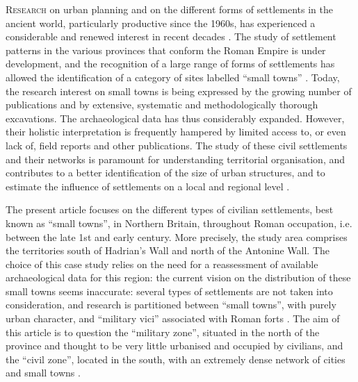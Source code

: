 	
\lettrine[lines=3,slope=4pt,findent=-3pt]{R}{esearch} on urban planning and on the different forms of settlements in the ancient world, particularly productive since the 1960s, has experienced a considerable and renewed interest in recent decades \parencite[227--228]{Petit_1994a}. The study of settlement patterns in the various provinces that conform the Roman Empire is under development, and the recognition of a large range of forms of settlements has allowed the identification of a category of sites labelled “small towns” \parencites[cf.]{Rodwell_1975}{Todd_1970}{Wacher_1995}. Today, the research interest on small towns is being expressed by the growing number of publications \parencites{Blagg_1984}{Favory_2012}{James_2001}{Jones_1991} and by extensive, systematic and methodologically thorough excavations. The archaeological data has thus considerably expanded. However, their holistic interpretation is frequently hampered by limited access to, or even lack of, field reports and other publications. The study of these civil settlements and their networks is paramount for understanding territorial organisation, and contributes to a better identification of the size of urban structures, and to estimate the influence of settlements on a local and regional level \parencite[19]{Mangin_1986}.
	
	The present article focuses on the different types of civilian settlements, best known as “small towns”, in Northern Britain, throughout Roman occupation, i.e. between the late 1st and early  century\AD. More precisely, the study area comprises the territories south of Hadrian's Wall and north of the Antonine Wall. The choice of this case study relies on the need for a reassessment of available archaeological data for this region: the current vision on the distribution of these small towns seems inaccurate: several types of settlements are not taken into consideration, and research is partitioned between “small towns”, with purely urban character, and “military vici” associated with Roman forts \parencites[e.g.]{Mattingly_2006}{Sommer_1984}{Wacher_1995}. The aim of this article is to question the “military zone”, situated in the north of the province and thought to be very little urbanised and occupied by civilians, and the “civil zone”, located in the south, with an extremely dense network of cities and small towns \parencites[cf.][3--5]{Haverfield_1912} {Jones_1990}. 
	
